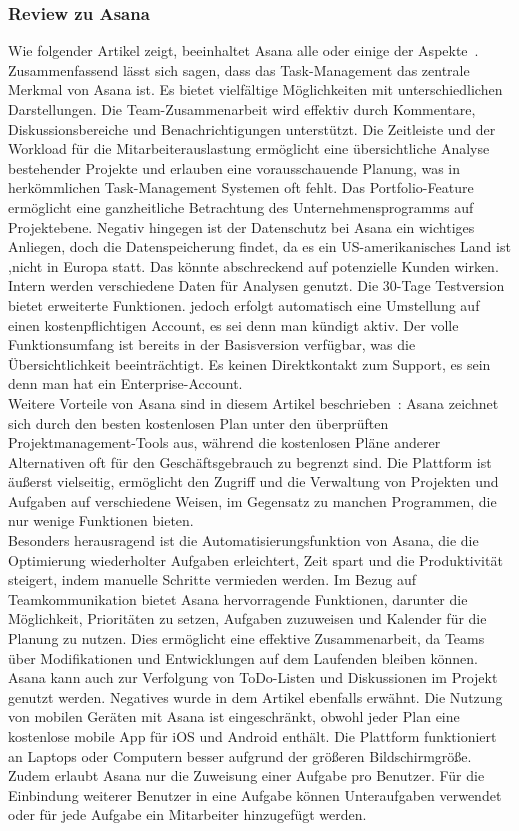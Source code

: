 \documentclass[sigconf, nonacm]{acmart}
\begin{document}
\subsubsection{Review zu Asana}
Wie folgender Artikel zeigt, beeinhaltet Asana alle oder einige der Aspekte~\cite{venzmer_projektmanagement_2020}. Zusammenfassend lässt sich sagen, dass das Task-Management das zentrale Merkmal von Asana ist. Es bietet vielfältige Möglichkeiten mit unterschiedlichen Darstellungen. Die Team-Zusammenarbeit wird effektiv durch Kommentare, Diskussionsbereiche und Benachrichtigungen unterstützt. Die Zeitleiste und der Workload für die Mitarbeiterauslastung ermöglicht eine übersichtliche Analyse bestehender Projekte und erlauben eine vorausschauende Planung, was in herkömmlichen Task-Management Systemen oft fehlt. Das Portfolio-Feature ermöglicht eine ganzheitliche Betrachtung des Unternehmensprogramms auf Projektebene.
Negativ hingegen ist der Datenschutz bei Asana ein wichtiges Anliegen, doch die Datenspeicherung findet, da es ein US-amerikanisches Land ist ,nicht in Europa statt. Das könnte abschreckend auf potenzielle Kunden wirken. Intern werden verschiedene Daten für Analysen genutzt. Die 30-Tage Testversion bietet erweiterte Funktionen. jedoch erfolgt automatisch eine Umstellung auf einen kostenpflichtigen Account, es sei denn man kündigt aktiv. Der volle Funktionsumfang ist bereits in der Basisversion verfügbar, was die Übersichtlichkeit beeinträchtigt. Es keinen Direktkontakt zum Support, es sein denn man hat ein Enterprise-Account.\\
Weitere Vorteile von Asana sind in diesem Artikel beschrieben~\cite{noauthor_asana_nodate}:
Asana zeichnet sich durch den besten kostenlosen Plan unter den überprüften Projektmanagement-Tools aus, während die kostenlosen Pläne anderer Alternativen oft für den Geschäftsgebrauch zu begrenzt sind. Die Plattform ist äußerst vielseitig, ermöglicht den Zugriff und die Verwaltung von Projekten und Aufgaben auf verschiedene Weisen, im Gegensatz zu manchen Programmen, die nur wenige Funktionen bieten.\\
Besonders herausragend ist die Automatisierungsfunktion von Asana, die die Optimierung wiederholter Aufgaben erleichtert, Zeit spart und die Produktivität steigert, indem manuelle Schritte vermieden werden.
Im Bezug auf Teamkommunikation bietet Asana hervorragende Funktionen, darunter die Möglichkeit, Prioritäten zu setzen, Aufgaben zuzuweisen und Kalender für die Planung zu nutzen. Dies ermöglicht eine effektive Zusammenarbeit, da Teams über Modifikationen und Entwicklungen auf dem Laufenden bleiben können. Asana kann auch zur Verfolgung von ToDo-Listen und Diskussionen im Projekt genutzt werden.
Negatives wurde in dem Artikel ebenfalls erwähnt. Die Nutzung von mobilen Geräten mit Asana ist eingeschränkt, obwohl jeder Plan eine kostenlose mobile App für iOS und Android enthält. Die Plattform funktioniert an Laptops oder Computern besser aufgrund der größeren Bildschirmgröße. Zudem erlaubt Asana nur die Zuweisung einer Aufgabe pro Benutzer. Für die Einbindung weiterer Benutzer in eine Aufgabe können Unteraufgaben verwendet oder für jede Aufgabe ein Mitarbeiter hinzugefügt werden.
\end{document}
